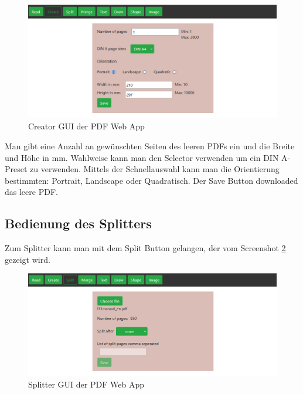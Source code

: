 \begin{figure}[!htbp]
	\centering
	\includegraphics[width=1\textwidth]{"images/creator.png"}
	\caption{Creator GUI der PDF Web App}
	\label{fig:creator}
\end{figure}

Man gibt eine Anzahl an gewünschten Seiten des leeren PDFs ein und die Breite und Höhe in mm. Wahlweise kann man den Selector verwenden um ein DIN A-Preset zu verwenden. Mittels der Schnellauswahl kann man die Orientierung bestimmten: Portrait, Landscape oder Quadratisch. Der Save Button downloaded das leere PDF. \\

\subsection{Bedienung des Splitters}
Zum Splitter kann man mit dem Split Button gelangen, der vom Screenshot \ref{fig:splitter} gezeigt wird.

\begin{figure}[!htbp]
	\centering
	\includegraphics[width=1\textwidth]{"images/splitter.png"}
	\caption{Splitter GUI der PDF Web App}
	\label{fig:splitter}
\end{figure}

